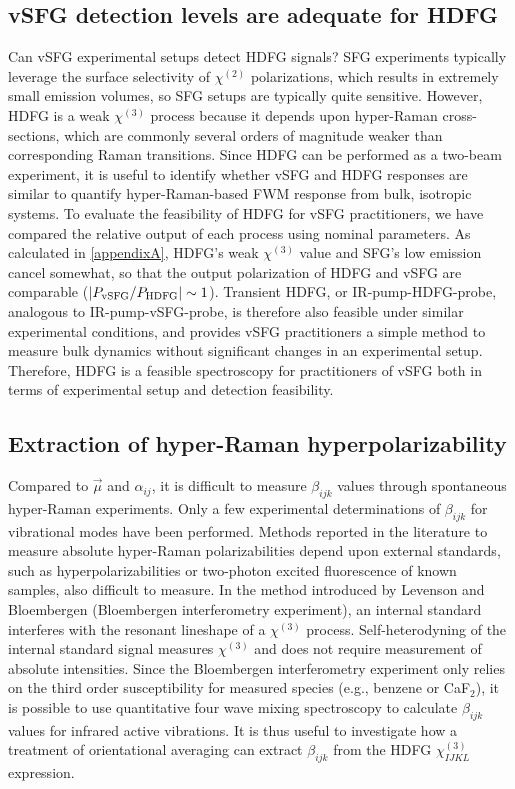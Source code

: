 \documentclass[aip, jcp, reprint, onecolumn, nofootinbib]{revtex4-2}
\begin{document}
\subsection{vSFG detection levels are adequate for HDFG}
Can vSFG experimental setups detect HDFG signals?
SFG experiments typically leverage the surface selectivity of $\chi^{(2)}$ polarizations, which results in extremely small emission volumes, so SFG setups are typically quite sensitive.
However, HDFG is a weak $\chi^{(3)}$ process because it depends upon hyper-Raman cross-sections, which are commonly several orders of magnitude weaker than corresponding Raman transitions.\cite{RN515}
Since HDFG can be performed as a two-beam experiment, it is useful to identify whether vSFG and HDFG responses are similar to quantify hyper-Raman-based FWM response from bulk, isotropic systems.
To evaluate the feasibility of HDFG for vSFG practitioners, we have compared the relative output of each process using nominal parameters. 
As calculated in \autoref{appendixA}, HDFG's weak $\chi^{(3)}$ value and SFG's low emission cancel somewhat, so that the output polarization of HDFG and vSFG are comparable ($\abs{P_\text{vSFG} / P_\text{HDFG}} \sim 1$).
Transient HDFG, or IR-pump-HDFG-probe, analogous to IR-pump-vSFG-probe, is therefore also feasible under similar experimental conditions, and provides vSFG practitioners a simple method to measure bulk dynamics without significant changes in an experimental setup. 
Therefore, HDFG is a feasible spectroscopy for practitioners of vSFG both in terms of experimental setup and detection feasibility.


\subsection{Extraction of hyper-Raman hyperpolarizability}

Compared to $\vec{\mu}$ and $\alpha_{ij}$, it is difficult to measure $\beta_{ijk}$ values through spontaneous hyper-Raman experiments.\cite{Kelley2010}
Only a few experimental determinations of $\beta_{ijk}$ for vibrational modes have been performed.\cite{Xu1997, Shoute2005, Kelley2010}
Methods reported in the literature to measure absolute hyper-Raman polarizabilities depend upon external standards, such as hyperpolarizabilities or two-photon excited fluorescence of known samples, also difficult to measure. \cite{Kelley2010} 
In the method introduced by Levenson and Bloembergen (Bloembergen interferometry experiment), an internal standard interferes with the resonant lineshape of a $\chi^{(3)}$ process. \cite{Levenson1974_1, Levenson1974_2}
Self-heterodyning of the internal standard signal measures $\chi^{(3)}$ and does not require measurement of absolute intensities. 
Since the Bloembergen interferometry experiment only relies on the third order susceptibility for measured species (e.g., benzene or CaF$_2$),\cite{Levenson1974_2} it is possible to use quantitative four wave mixing spectroscopy to calculate $\beta_{ijk}$ values for infrared active vibrations.
It is thus useful to investigate how a treatment of orientational averaging can extract $\beta_{ijk}$ from the HDFG $\chi^{(3)}_{IJKL}$ expression.
\end{document}
